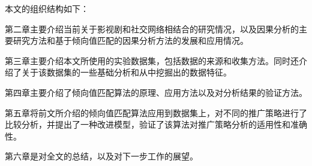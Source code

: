 本文的组织结构如下：

第二章主要介绍当前关于影视剧和社交网络相结合的研究情况，以及因果分析的主要研究方法和基于倾向值匹配的因果分析方法的发展和应用情况。

第三章主要介绍本文所使用的实验数据集，包括数据的来源和收集方法。同时还介绍了关于该数据集的一些基础分析和从中挖掘出的数据特征。

第四章主要介绍了倾向值匹配算法的原理、应用方法以及对分析结果的验证方法。

第五章将前文所介绍的倾向值匹配算法应用到数据集上，对不同的推广策略进行了比较分析，并提出了一种改进模型，验证了该算法对推广策略分析的适用性和准确性。

第六章是对全文的总结，以及对下一步工作的展望。




































